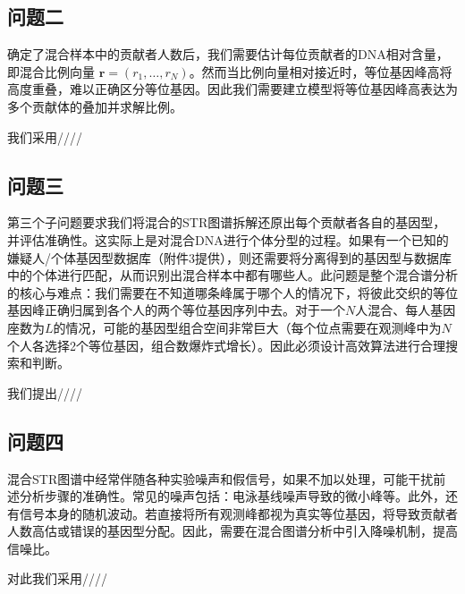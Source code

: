 \subsection[\hspace{-2pt}问题二]{{\heiti{} \hspace{-8pt}问题二}}\label{section1: 问题二}
确定了混合样本中的贡献者人数后，我们需要估计每位贡献者的DNA相对含量，即混合比例向量 $\mathbf{r}=(r_1,\dots,r_N)$。然而当比例向量相对接近时，等位基因峰高将高度重叠，难以正确区分等位基因。因此我们需要建立模型将等位基因峰高表达为多个贡献体的叠加并求解比例。

我们采用////
\subsection[\hspace{-2pt}问题三]{{\heiti{} \hspace{-8pt}问题三}}\label{section1: 问题三}
第三个子问题要求我们将混合的STR图谱拆解还原出每个贡献者各自的基因型，并评估准确性。这实际上是对混合DNA进行个体分型的过程。如果有一个已知的嫌疑人/个体基因型数据库（附件3提供），则还需要将分离得到的基因型与数据库中的个体进行匹配，从而识别出混合样本中都有哪些人。此问题是整个混合谱分析的核心与难点：我们需要在不知道哪条峰属于哪个人的情况下，将彼此交织的等位基因峰正确归属到各个人的两个等位基因序列中去。对于一个$N$人混合、每人基因座数为$L$的情况，可能的基因型组合空间非常巨大（每个位点需要在观测峰中为$N$个人各选择2个等位基因，组合数爆炸式增长）。因此必须设计高效算法进行合理搜索和判断。

我们提出////
\subsection[\hspace{-2pt}问题四]{{\heiti{} \hspace{-8pt}问题四}}\label{section1: 问题四}
混合STR图谱中经常伴随各种实验噪声和假信号，如果不加以处理，可能干扰前述分析步骤的准确性。常见的噪声包括：电泳基线噪声导致的微小峰等。此外，还有信号本身的随机波动。若直接将所有观测峰都视为真实等位基因，将导致贡献者人数高估或错误的基因型分配。因此，需要在混合图谱分析中引入降噪机制，提高信噪比。

对此我们采用////
